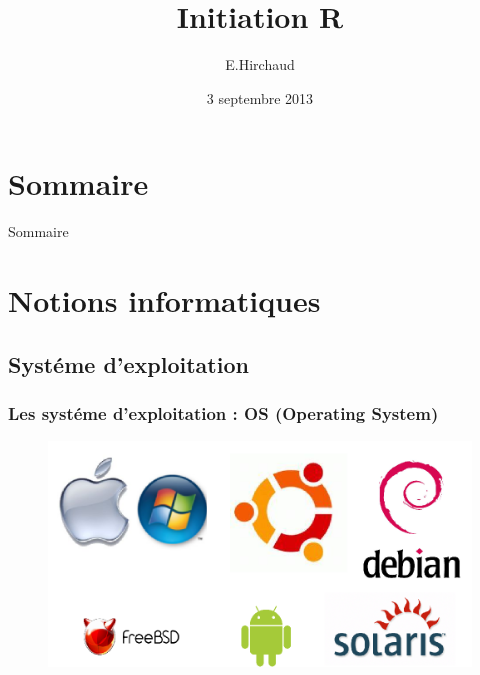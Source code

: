 \documentclass{beamer}
\title{Initiation R}
\institute{BiRD}
\date{3 septembre 2013}
\author{E.Hirchaud}
\begin{document}
\begin{frame}
	\titlepage
\end{frame}
	

\section*{Sommaire}
\begin{frame}{Sommaire}
	\small \tableofcontents
\end{frame}

\section{Notions informatiques}

\subsection{Systéme d'exploitation}
\begin{frame}
	\frametitle{Les systéme d'exploitation : OS (Operating System)}
	\begin{figure}
		\includegraphics[scale=0.55]{image/OSimage.png}
	\end{figure}
\end{frame}
\end{document}
